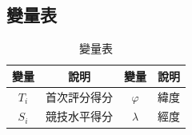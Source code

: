 \subsection{變量表}
\begin{table}[H]
    \begin{center}
        \begin{tabular}{|cc||cc|}
        \hline
        變量 & 說明  & 變量 & 說明           \\ \hline
        $T_i$   & 首次評分得分 &$\varphi$   & 緯度        \\
        $S_i$   & 競技水平得分 &  $\lambda$   & 經度      \\
        \hline
        \end{tabular}
    \end{center}
    \caption{變量表}
    \label{fig:variables}
\end{table}